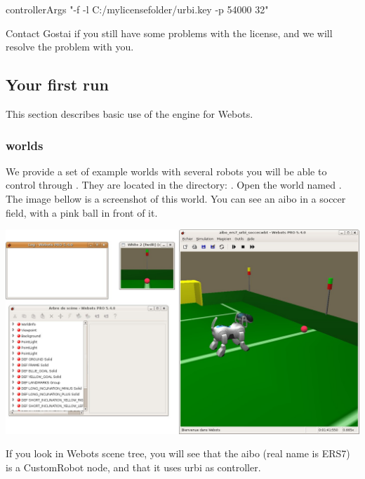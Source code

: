 \begin{shell}
controllerArgs "-f -l C:/mylicensefolder/urbi.key  -p 54000 32"
\end{shell}

Contact Gostai if you still have some problems with the license, and
we will resolve the problem with you.

\subsection{Your first run}

This section describes basic use of the \urbi engine for Webots.

\subsubsection{\urbi worlds}

We provide a set of example worlds with several robots you will be
able to control through \urbi. They are located in the directory:
.  Open the
world named . The image bellow is a
screenshot of this world. You can see an aibo in a soccer field, with
a pink ball in front of it.


\begin{center}
  \includegraphics[width=\linewidth]{img/webots/aibo-soccer}
\end{center}

If you look in Webots scene tree, you will see that the aibo (real
name is ERS7) is a CustomRobot node, and that it uses urbi as
controller.

